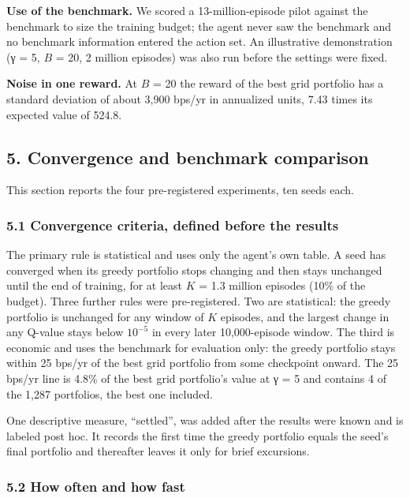 \documentclass[
  11pt]{article}
\begin{document}
\textbf{Use of the benchmark.} We scored a 13-million-episode pilot
against the benchmark to size the training budget; the agent never saw
the benchmark and no benchmark information entered the action set. An
illustrative demonstration (γ = 5, \(B\) = 20, 2 million episodes) was
also run before the settings were fixed.

\textbf{Noise in one reward.} At \(B\) = 20 the reward of the best grid
portfolio has a standard deviation of about 3,900 bps/yr in annualized
units, 7.43 times its expected value of 524.8.

\subsection{5. Convergence and benchmark
comparison}\label{convergence-and-benchmark-comparison}

This section reports the four pre-registered experiments, ten seeds
each.

\subsubsection{5.1 Convergence criteria, defined before the
results}\label{convergence-criteria-defined-before-the-results}

The primary rule is statistical and uses only the agent's own table. A
seed has converged when its greedy portfolio stops changing and then
stays unchanged until the end of training, for at least \(K\) = 1.3
million episodes (10\% of the budget). Three further rules were
pre-registered. Two are statistical: the greedy portfolio is unchanged
for any window of \(K\) episodes, and the largest change in any Q-value
stays below \(10^{-5}\) in every later 10,000-episode window. The third
is economic and uses the benchmark for evaluation only: the greedy
portfolio stays within 25 bps/yr of the best grid portfolio from some
checkpoint onward. The 25 bps/yr line is 4.8\% of the best grid
portfolio's value at γ = 5 and contains 4 of the 1,287 portfolios, the
best one included.

One descriptive measure, ``settled'', was added after the results were
known and is labeled post hoc. It records the first time the greedy
portfolio equals the seed's final portfolio and thereafter leaves it
only for brief excursions.

\subsubsection{5.2 How often and how fast}\label{how-often-and-how-fast}
\end{document}
